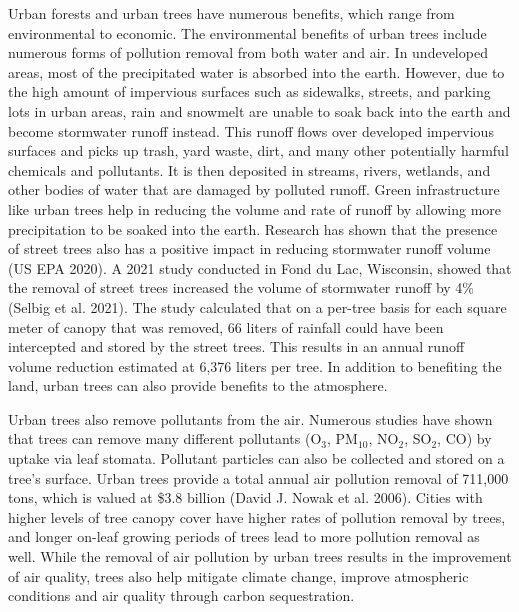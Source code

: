 \documentclass[12pt,twoside]{reedthesis}
\begin{document}
Urban forests and urban trees have numerous benefits, which range from
environmental to economic. The environmental benefits of urban trees
include numerous forms of pollution removal from both water and air. In
undeveloped areas, most of the precipitated water is absorbed into the
earth. However, due to the high amount of impervious surfaces such as
sidewalks, streets, and parking lots in urban areas, rain and snowmelt
are unable to soak back into the earth and become stormwater runoff
instead. This runoff flows over developed impervious surfaces and picks
up trash, yard waste, dirt, and many other potentially harmful chemicals
and pollutants. It is then deposited in streams, rivers, wetlands, and
other bodies of water that are damaged by polluted runoff. Green
infrastructure like urban trees help in reducing the volume and rate of
runoff by allowing more precipitation to be soaked into the earth.
Research has shown that the presence of street trees also has a positive
impact in reducing stormwater runoff volume (US EPA 2020). A 2021 study
conducted in Fond du Lac, Wisconsin, showed that the removal of street
trees increased the volume of stormwater runoff by 4\% (Selbig et al. 2021). The
study calculated that on a per-tree basis for each square meter of
canopy that was removed, 66 liters of rainfall could have been
intercepted and stored by the street trees. This results in an annual
runoff volume reduction estimated at 6,376 liters per tree. In addition
to benefiting the land, urban trees can also provide benefits to the
atmosphere.

Urban trees also remove pollutants from the air. Numerous studies have
shown that trees can remove many different pollutants (O\(_3\), PM\(_{10}\),
NO\(_2\), SO\(_2\), CO) by uptake via leaf stomata. Pollutant particles can
also be collected and stored on a tree's surface. Urban trees provide a
total annual air pollution removal of 711,000 tons, which is valued at
\$3.8 billion (David J. Nowak et al. 2006). Cities with higher levels of tree canopy
cover have higher rates of pollution removal by trees, and longer
on-leaf growing periods of trees lead to more pollution removal as well.
While the removal of air pollution by urban trees results in the
improvement of air quality, trees also help mitigate climate change,
improve atmospheric conditions and air quality through carbon
sequestration.
\end{document}
